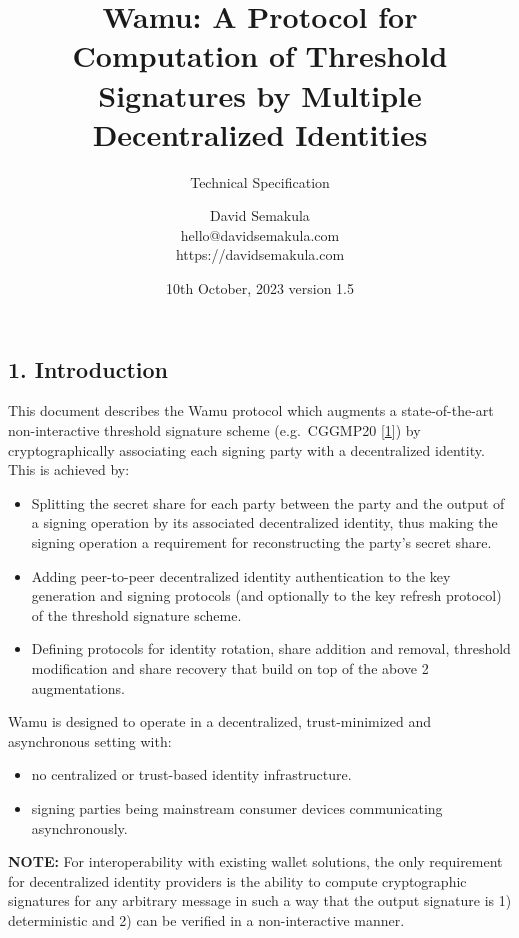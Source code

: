\documentclass[
]{article}
\title{Wamu: A Protocol for Computation of Threshold Signatures by
Multiple Decentralized Identities}
\subtitle{Technical Specification}
\author{David Semakula\\
hello@davidsemakula.com\\
https://davidsemakula.com}
\date{10th October, 2023 \textbar{} version 1.5}
\providecommand{\tightlist}{%
  \setlength{\itemsep}{0pt}\setlength{\parskip}{0pt}}
\begin{document}
\maketitle

{
\setcounter{tocdepth}{3}
\tableofcontents
}
\hypertarget{introduction}{%
\subsection{1. Introduction}\label{introduction}}

This document describes the Wamu protocol which augments a
state-of-the-art non-interactive threshold signature scheme
(e.g.~CGGMP20 {[}\protect\hyperlink{ref-cggmp20}{1}{]}) by
cryptographically associating each signing party with a decentralized
identity. This is achieved by:

\begin{itemize}
\tightlist
\item
  Splitting the secret share for each party between the party and the
  output of a signing operation by its associated decentralized
  identity, thus making the signing operation a requirement for
  reconstructing the party's secret share.
\item
  Adding peer-to-peer decentralized identity authentication to the key
  generation and signing protocols (and optionally to the key refresh
  protocol) of the threshold signature scheme.
\item
  Defining protocols for identity rotation, share addition and removal,
  threshold modification and share recovery that build on top of the
  above 2 augmentations.
\end{itemize}

Wamu is designed to operate in a decentralized, trust-minimized and
asynchronous setting with:

\begin{itemize}
\tightlist
\item
  no centralized or trust-based identity infrastructure.
\item
  signing parties being mainstream consumer devices communicating
  asynchronously.
\end{itemize}

\textbf{NOTE:} For interoperability with existing wallet solutions, the
only requirement for decentralized identity providers is the ability to
compute cryptographic signatures for any arbitrary message in such a way
that the output signature is 1) deterministic and 2) can be verified in
a non-interactive manner.
\end{document}
